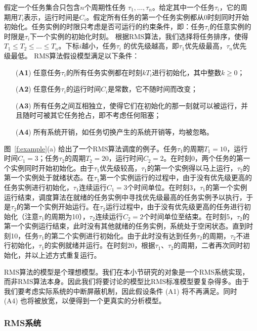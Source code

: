 假定一个任务集合只包含$n$个周期性任务
$\tau_1,\ldots,\tau_n$。给定其中一个任务$\tau_i$，它的周期用$T_i$表示，运行时间是$C_i$。假定所有任务的第一个任务实例都从$0$时刻同时开始初始化。任务实例的时限只考虑是否可运行的约束条件，即：任务$\tau_i$的任意实例的时限是$\tau_i$下一个实例的初始化时刻。
根据RMS算法，我们选择将任务排序，使得$T_1\le T_2\le \ldots \le T_n$。下标$i$越小，任务$\tau_i$ 的优先级越高，即$\tau_1$优先级最高，$\tau_n$优先级最低。
RMS算法假设模型满足以下条件：
\begin{enumerate}
\item[(\textbf{A1})] 
    任意任务$\tau_i$的所有任务实例都在时刻$kT_i$进行初始化，其中整数$k\ge 0$；
\item[(\textbf{A2})] 
    任意任务$\tau_i$的运行时间$C_i$是常数，它不随时间而改变；
\item[(\textbf{A3})]
    所有任务之间互相独立，使得它们在初始化的那一刻就可以被运行，并且随时可被其它任务抢占，即不考虑任何阻塞；
\item[(\textbf{A4})] 
    所有系统开销，如任务切换产生的系统开销等，均被忽略。
\end{enumerate}

图~\ref{f:example}(a) 给出了一个RMS算法调度的例子。任务$\tau_1$的周期$T_1=10$，运行时间$C_1=3$；任务$\tau_2$的周期$T_2=20$，运行时间$C_2=2$。在时刻0，两个任务的第一个实例同时开始初始化。由于$\tau_1$优先级较高，$\tau_1$的第一个实例得以马上运行，$\tau_2$的第一个实例处于就绪状态。在$\tau_1$第一个实例运行的过程中，由于没有优先级更高的任务实例进行初始化，$\tau_1$连续运行$C_1=3$个时间单位。在时刻3，$\tau_1$的第一个实例运行结束，调度算法在就绪的任务实例中寻找优先级最高的任务实例予以执行，于是$\tau_2$的第一个实例开始运行。在$\tau_2$运行过程中，由于没有优先级更高的任务进行初始化（注意$\tau_1$的周期为10），$\tau_2$连续运行$C_2=2$个时间单位至结束。在时刻5，$\tau_2$的第一个实例运行结束，此时没有其他就绪的任务实例，系统处于空闲状态。直到时刻10，任务$\tau_1$的第二个实例进行初始化。由于此时没有达到任务$\tau_2$的周期，$\tau_2$不进行初始化，$\tau_1$的实例就绪并运行。在时刻20，根据$\tau_1$、$\tau_2$的周期，二者再次同时初始化，并以上述方式重复运行。 


RMS算法的模型是个理想模型。我们在本小节研究的对象是一个RMS系统实现，而非RMS算法本身。因此我们将要讨论的模型比RMS标准模型要复杂得多。由于我们要考虑实际系统的中断屏蔽机制，因此假设条件 (A1) 将不再满足。同时 (A4) 也将被放宽，以便得到一个更真实的分析模型。

\subsubsection{RMS系统} 
\label{s:imp}

